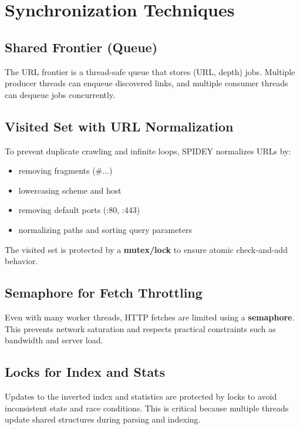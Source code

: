 \documentclass[11pt,a4paper]{article}
\begin{document}
\section{Synchronization Techniques}
\subsection{Shared Frontier (Queue)}
The URL frontier is a thread-safe queue that stores (URL, depth) jobs. Multiple producer threads can enqueue discovered links, and multiple consumer threads can dequeue jobs concurrently.

\subsection{Visited Set with URL Normalization}
To prevent duplicate crawling and infinite loops, SPIDEY normalizes URLs by:
\begin{itemize}
  \item removing fragments (\#...)
  \item lowercasing scheme and host
  \item removing default ports (:80, :443)
  \item normalizing paths and sorting query parameters
\end{itemize}
The visited set is protected by a \textbf{mutex/lock} to ensure atomic check-and-add behavior.

\subsection{Semaphore for Fetch Throttling}
Even with many worker threads, HTTP fetches are limited using a \textbf{semaphore}. This prevents network saturation and respects practical constraints such as bandwidth and server load.

\subsection{Locks for Index and Stats}
Updates to the inverted index and statistics are protected by locks to avoid inconsistent state and race conditions. This is critical because multiple threads update shared structures during parsing and indexing.

\end{document}
